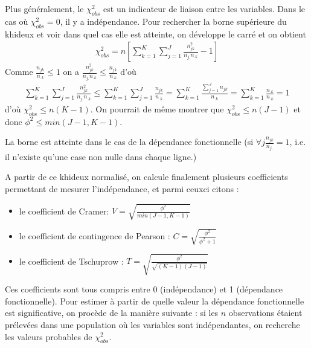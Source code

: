 \documentclass[letterpaper,10pt,french]{sphinxmanual}
\begin{document}
\sphinxAtStartPar
Plus généralement, le \(\chi^2_{obs}\) est un indicateur de liaison entre les variables.  Dans le cas où \(\chi^2_{obs}=0\), il y a indépendance. Pour rechercher la borne supérieure du khi\sphinxhyphen{}deux et voir dans quel cas elle est atteinte, on développe le carré et on obtient
\begin{equation*}
\begin{split}\chi^2_{obs} = n\left [\displaystyle\sum_{k=1}^K\displaystyle\sum_{j=1}^J \frac{n_{jk}^2}{n_{j.}n_{.k}} -1\right ]\end{split}
\end{equation*}
\sphinxAtStartPar
Comme \(\frac{n_{jk}}{n_{.k}}\leq 1\) on a \( \frac{n_{jk}^2}{n_{j.}n_{.k}} \leq \frac{n_{jk}}{n_{.k}}\) d’où
\begin{equation*}
\begin{split}\displaystyle\sum_{k=1}^K\displaystyle\sum_{j=1}^J\frac{n_{jk}^2}{n_{j.}n_{.k}}\leq \displaystyle\sum_{k=1}^K\displaystyle\sum_{j=1}^J \frac{n_{jk}}{n_{.k}} = \displaystyle\sum_{k=1}^K \frac{\displaystyle\sum_{j=1}^J n_{jk}}{n_{.k}}=\displaystyle\sum_{k=1}^K \frac{n_{.k}}{n_{.k}}=1\end{split}
\end{equation*}
\sphinxAtStartPar
d’où \(\chi^2_{obs}\leq n(K-1)\). On pourrait de même montrer que \(\chi^2_{obs}\leq n(J-1)\) et donc \(\phi^2\leq min(J-1,K-1)\).

\sphinxAtStartPar
La borne est atteinte dans le cas de la dépendance fonctionnelle (si \(\forall j \frac{n_{jk}}{n_{j.}}=1\), i.e. il n’existe qu’une case non nulle dans chaque ligne.)

\sphinxAtStartPar
A partir de ce khi\sphinxhyphen{}deux normalisé, on calcule finalement plusieurs coefficients permettant de mesurer l’indépendance, et parmi ceux\sphinxhyphen{}ci citons :
\begin{itemize}
\item {} 
\sphinxAtStartPar
le coefficient de Cramer:
\(V=\sqrt{\frac{\phi^2}{min(J-1,K-1)}}\)

\item {} 
\sphinxAtStartPar
le coefficient de contingence de Pearson :
\(C = \sqrt{\frac{\phi^2}{\phi^2 + 1}}\)

\item {} 
\sphinxAtStartPar
le coefficient de Tschuprow :
\(T = \sqrt{\frac{\phi^2}{\sqrt{(K-1)(J-1)}}}\)

\end{itemize}

\sphinxAtStartPar
Ces coefficients sont tous compris entre 0 (indépendance) et 1 (dépendance fonctionnelle). Pour estimer à partir de quelle valeur la dépendance fonctionnelle est significative, on procède de la manière suivante : si les \(n\) observations étaient prélevées dans une population où les variables sont indépendantes, on recherche les valeurs probables de \(\chi^2_{obs}\).
\end{document}
